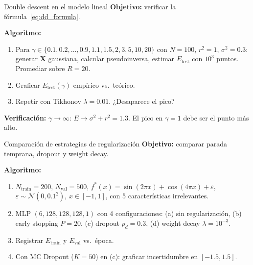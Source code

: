 \begin{ejerciciocomp}{Double descent en el modelo lineal}
\label{ejcomp:dd_lineal}
\textbf{Objetivo:} verificar la fórmula~\eqref{eq:dd_formula}.

\medskip\noindent\textbf{Algoritmo:}
\begin{enumerate}
  \item Para $\gamma \in \{0.1, 0.2, \ldots, 0.9, 1.1, 1.5, 2, 3, 5,
        10, 20\}$ con $N = 100$, $r^2 = 1$, $\sigma^2 = 0.3$:
        generar $\bm{X}$ gaussiana, calcular pseudoinversa, estimar
        $E_{\text{test}}$ con $10^3$ puntos. Promediar sobre $R = 20$.
  \item Graficar $E_{\text{test}}(\gamma)$ empírico vs.\ teórico.
  \item Repetir con Tikhonov $\lambda = 0.01$. ¿Desaparece el pico?
\end{enumerate}

\medskip\noindent\textbf{Verificación:}
$\gamma \to \infty$: $E \to \sigma^2 + r^2 = 1.3$.
El pico en $\gamma = 1$ debe ser el punto más alto.
\end{ejerciciocomp}

\begin{ejerciciocomp}{Comparación de estrategias de regularización}
\label{ejcomp:reg_comparacion}
\textbf{Objetivo:} comparar parada temprana, dropout y weight decay.

\medskip\noindent\textbf{Algoritmo:}
\begin{enumerate}
  \item $N_{\text{train}} = 200$, $N_{\text{val}} = 500$,
        $f^*(x) = \sin(2\pi x) + \cos(4\pi x) + \varepsilon$,
        $\varepsilon \sim \mathcal{N}(0, 0.1^2)$, $x \in [-1,1]$,
        con 5 características irrelevantes.
  \item MLP $(6, 128, 128, 128, 1)$ con 4 configuraciones:
        (a) sin regularización, (b) early stopping $P = 20$,
        (c) dropout $p_d = 0.3$, (d) weight decay $\lambda = 10^{-3}$.
  \item Registrar $E_{\text{train}}$ y $E_{\text{val}}$ vs.\ época.
  \item Con MC Dropout ($K = 50$) en (c): graficar incertidumbre en
        $[-1.5, 1.5]$.
\end{enumerate}
\end{ejerciciocomp}

